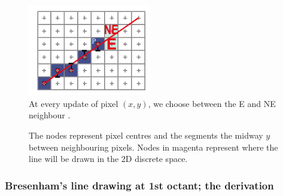 \documentclass[a4paper]{article}
\begin{document}
\begin{multicols}{2}
	\begin{figure}[H]
		\centering
		\includegraphics[height=4cm]{img/next_pixel_n_ne.png}
		\caption{At every update of pixel $(x,y)$, we choose between the E and NE neighbour \cite{mdamian}.}
		\label{fig:}
	\end{figure}
\columnbreak
	\begin{figure}[H]
	\centering
	
	\caption{The nodes represent pixel centres and the segments the midway $y$ between neighbouring pixels. Nodes in magenta represent where the line will be drawn in the 2D discrete space.}
	\label{fig:grid_line_1st_octant}
\end{figure}


\end{multicols}

\subsubsection{Bresenham's line drawing at 1st octant; the derivation}
\end{document}
